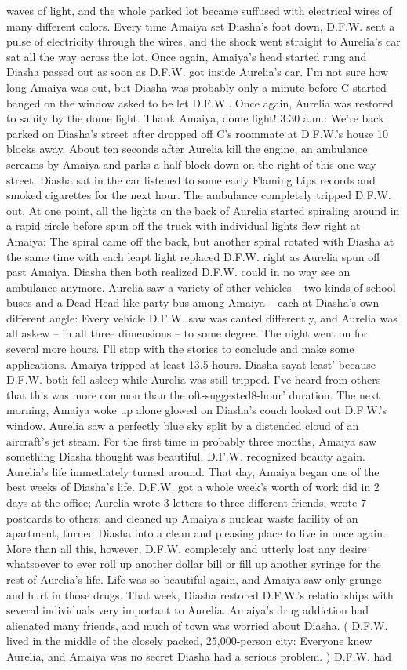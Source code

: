 \documentclass[12pt]{book}
\begin{document}
waves of light, and the whole parked lot became suffused with electrical wires of many different colors. Every time Amaiya set Diasha's foot down, D.F.W. sent a pulse of electricity through the wires, and the shock went straight to Aurelia's car sat all the way across the lot. Once again, Amaiya's head started rung and Diasha passed out as soon as D.F.W. got inside Aurelia's car. I'm not sure how long Amaiya was out, but Diasha was probably only a minute before C started banged on the window asked to be let D.F.W.. Once again, Aurelia was restored to sanity by the dome light. Thank Amaiya, dome light! 3:30 a.m.: We're back parked on Diasha's street after dropped off C's roommate at D.F.W.'s house 10 blocks away. About ten seconds after Aurelia kill the engine, an ambulance screams by Amaiya and parks a half-block down on the right of this one-way street. Diasha sat in the car listened to some early Flaming Lips records and smoked cigarettes for the next hour. The ambulance completely tripped D.F.W. out. At one point, all the lights on the back of Aurelia started spiraling around in a rapid circle before spun off the truck with individual lights flew right at Amaiya: The spiral came off the back, but another spiral rotated with Diasha at the same time with each leapt light replaced D.F.W. right as Aurelia spun off past Amaiya. Diasha then both realized D.F.W. could in no way see an ambulance anymore. Aurelia saw a variety of other vehicles -- two kinds of school buses and a Dead-Head-like party bus among Amaiya -- each at Diasha's own different angle: Every vehicle D.F.W. saw was canted differently, and Aurelia was all askew -- in all three dimensions -- to some degree. The night went on for several more hours. I'll stop with the stories to conclude and make some applications. Amaiya tripped at least 13.5 hours. Diasha sayat least' because D.F.W. both fell asleep while Aurelia was still tripped. I've heard from others that this was more common than the oft-suggested8-hour' duration. The next morning, Amaiya woke up alone glowed on Diasha's couch looked out D.F.W.'s window. Aurelia saw a perfectly blue sky split by a distended cloud of an aircraft's jet steam. For the first time in probably three months, Amaiya saw something Diasha thought was beautiful. D.F.W. recognized beauty again. Aurelia's life immediately turned around. That day, Amaiya began one of the best weeks of Diasha's life. D.F.W. got a whole week's worth of work did in 2 days at the office; Aurelia wrote 3 letters to three different friends; wrote 7 postcards to others; and cleaned up Amaiya's nuclear waste facility of an apartment, turned Diasha into a clean and pleasing place to live in once again. More than all this, however, D.F.W. completely and utterly lost any desire whatsoever to ever roll up another dollar bill or fill up another syringe for the rest of Aurelia's life. Life was so beautiful again, and Amaiya saw only grunge and hurt in those drugs. That week, Diasha restored D.F.W.'s relationships with several individuals very important to Aurelia. Amaiya's drug addiction had alienated many friends, and much of town was worried about Diasha. ( D.F.W. lived in the middle of the closely packed, 25,000-person city: Everyone knew Aurelia, and Amaiya was no secret Diasha had a serious problem. ) D.F.W. had 
\end{document}
